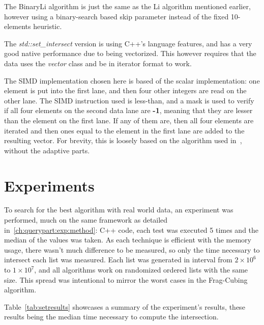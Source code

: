 The BinaryLi algorithm is just the same as the Li algorithm mentioned earlier, however using a binary-search based skip parameter instead of the fixed 10-elements heuristic.

The \textit{std::set\_intersect} version is using C++'s language features, and has a very good native performance due to being vectorized.
This however requires that the data uses the \textit{vector} class and be in iterator format to work.

The SIMD implementation chosen here is based of the scalar implementation: one element is put into the first lane, and then four other integers are read on the other lane.
The SIMD instruction used is less-than, and a mask is used to verify if all four elements on the second data lane are \textbf{-1}, meaning that they are lesser than the element on the first lane.
If any of them are, then all four elements are iterated and then ones equal to the element in the first lane are added to the resulting vector.
For brevity, this is loosely based on the algorithm used in~, without the adaptive parts.

\section{Experiments}\label{ap:a:results}

To search for the best algorithm with real world data, an experiment was performed, much on the same framework as detailed in~\ref{ch:querypart:exp:method}: C++ code, each test was executed 5 times and the median of the values was taken.
As each technique is efficient with the memory usage, there wasn't much difference to be measured, so only the time necessary to intersect each list was measured.
Each list was generated in interval from $2\times10^6$ to $1\times10^7$, and all algorithms work on randomized ordered lists with the same size.
This spread was intentional to mirror the worst cases in the Frag-Cubing algorithm.

Table~\ref{tab:setresults} showcases a summary of the experiment's results, these results being the median time necessary to compute the intersection.

